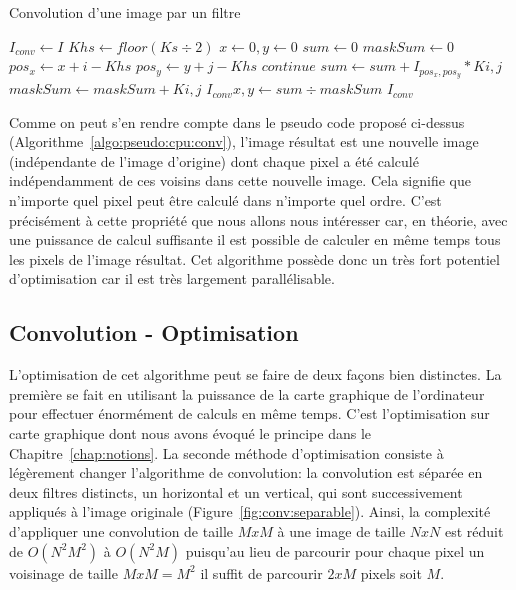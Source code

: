 \begin{algorithm}[H]
	\caption{Convolution d'une image par un filtre}
	\begin{algorithmic}
		\State $I_{conv} \gets I$
		\State $Khs \gets floor(Ks \div 2)$
		\State $x \gets 0, y \gets 0$
		\State $sum \gets 0$
			\State $maskSum \gets 0$
					\State ${pos_x \gets x + i - Khs}$ 
					\State ${pos_y \gets y + j - Khs}$ 
					 
						\State $continue$
					\EndIf
					\State $sum \gets sum + I_{pos_x, pos_y} * K{i, j}$ 
					\State $maskSum \gets maskSum + K{i, j}$
					\EndFor
				\EndFor
				\State $I_{conv}{x, y} \gets sum \div maskSum$ 
			\EndFor
		\EndFor
		\State \Return $I_{conv}$ 
		\EndProcedure
	\end{algorithmic}
	\label{algo:pseudo:cpu:conv}
\end{algorithm}

Comme on peut s'en rendre compte dans le pseudo code proposé ci-dessus (Algorithme~\ref{algo:pseudo:cpu:conv}), l'image résultat est une nouvelle image (indépendante de l'image d'origine) dont chaque pixel a été calculé indépendamment de ces voisins dans cette nouvelle image. Cela signifie que n'importe quel pixel peut être calculé dans n'importe quel ordre. C'est précisément à cette propriété que nous allons nous intéresser car, en théorie, avec une puissance de calcul suffisante il est possible de calculer en même temps tous les pixels de l'image résultat. Cet algorithme possède donc un très fort potentiel d'optimisation car il est très largement parallélisable.

\subsection{Convolution - Optimisation}
L'optimisation de cet algorithme peut se faire de deux façons bien distinctes. La première se fait en utilisant la puissance de la carte graphique de l'ordinateur pour effectuer énormément de calculs en même temps. C'est l'optimisation sur carte graphique dont nous avons évoqué le principe dans le Chapitre~\ref{chap:notions}. La seconde méthode d'optimisation consiste à légèrement changer l'algorithme de convolution: la convolution est séparée en deux filtres distincts\cite{podlozhnyuk2007image}, un horizontal et un vertical, qui sont successivement appliqués à l'image originale (Figure~\ref{fig:conv:separable}). Ainsi, la complexité d'appliquer une convolution de taille $MxM$ à une image de taille $NxN$ est réduit de $O(N^2M^2)$ à $O(N^2M)$ puisqu'au lieu de parcourir pour chaque pixel un voisinage de taille $MxM = M ^2$ il suffit de parcourir $2xM$ pixels soit $M$.

